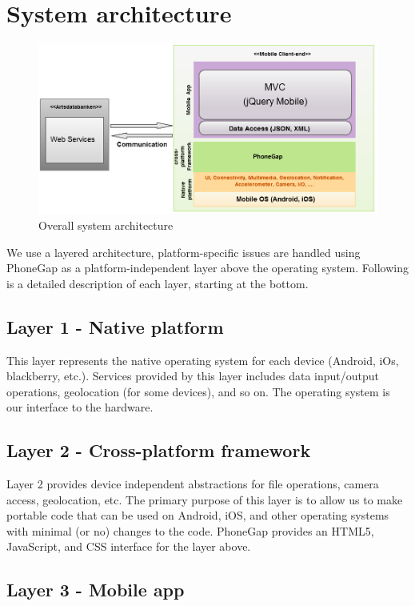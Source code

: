 \section{System architecture}
\begin{figure}[htb]
	\centering
	\includegraphics[width=1.0\textwidth]{architecture/architecture.png}
	\caption{Overall system architecture}
	\label{fig:architecture}
\end{figure}

We use a layered architecture, platform-specific issues are handled using
PhoneGap as a platform-independent layer above the operating system. Following
is a detailed description of each layer, starting at the bottom.

\subsection{Layer 1 - Native platform}

This layer represents the native operating system for each device (Android, iOs,
blackberry, etc.). Services provided by this layer includes data input/output
operations, geolocation (for some devices), and so on. The operating system is
our interface to the hardware.

\subsection{Layer 2 - Cross-platform framework}

Layer 2 provides device independent abstractions for file operations, camera
access, geolocation, etc. The primary purpose of this layer is to allow us to
make portable code that can be used on Android, iOS, and other operating systems
with minimal (or no) changes to the code. PhoneGap provides an HTML5,
JavaScript, and CSS interface for the layer above.

\subsection{Layer 3 - Mobile app}

